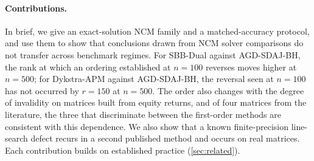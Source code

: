 \paragraph{Contributions.}
In brief, we give an exact-solution NCM family and a matched-accuracy
protocol, and use them to show that conclusions drawn from NCM solver
comparisons do not transfer across benchmark regimes. For SBB-Dual against
AGD-SDAJ-BH, the rank at which an ordering established at $n=100$ reverses
moves higher at $n=500$; for Dykstra-APM against AGD-SDAJ-BH, the reversal
seen at $n=100$ has not occurred by $r=150$ at $n=500$. The order
also changes with the degree of invalidity on matrices built from equity
returns, and of four matrices from the literature, the three that
discriminate between the first-order methods are consistent with this
dependence. We also show that a known
finite-precision line-search defect recurs in a second published method and
occurs on real matrices.
Each contribution builds on established practice (\cref{sec:related}).
